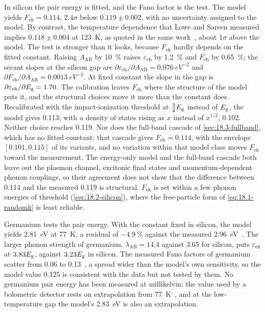 In silicon the pair energy is fitted, and the Fano factor is the test. The model yields $F_{\mathrm{eh}} = 0.114$, $2.4\sigma$ below $0.119 \pm 0.002$, with no uncertainty assigned to the model. By contrast, the temperature dependence that Lowe and Sareen measured implies $0.118 \pm 0.004$ at \SI{123}{K}, as quoted in the same work~\cite{rodrigues2021absolute}, about $1\sigma$ above the model. The test is stronger than it looks, because $F_{\mathrm{eh}}$ hardly depends on the fitted constant. Raising $A_{\mathrm{AB}}$ by \SI{10}{\percent} raises $\varepsilon_{\mathrm{eh}}$ by \SI{1.2}{\percent} and $F_{\mathrm{eh}}$ by \SI{0.65}{\percent}; the secant slopes at the silicon gap are $\partial\varepsilon_{\mathrm{eh}}/\partial A_{\mathrm{AB}} = \SI{0.076}{eV^{-2}}$ and $\partial F_{\mathrm{eh}}/\partial A_{\mathrm{AB}} = \SI{0.0013}{eV^{-3}}$. At fixed constant the slope in the gap is $\partial\varepsilon_{\mathrm{eh}}/\partial E_{\mathrm{g}} = 1.70$. The calibration leaves $F_{\mathrm{eh}}$ where the structure of the model puts it, and the structural choices move it more than the constant does. Recalibrated with the impact-ionization threshold at $\frac32E_{\mathrm{g}}$ instead of $E_{\mathrm{g}}$, the model gives 0.113; with a density of states rising as $x$ instead of $x^{1/2}$, 0.102. Neither choice reaches 0.119. Nor does the full-band cascade of \cref{sec:18.3-fullband}, which has no fitted constant: that cascade gives $F_{\mathrm{eh}} = 0.114$, with the envelope $[0.101, 0.115]$ of its variants, and no variation within that model class moves $F_{\mathrm{eh}}$ toward the measurement. The energy-only model and the full-band cascade both leave out the plasmon channel, excitonic final states and momentum-dependent phonon couplings, so their agreement does not show that the difference between 0.114 and the measured 0.119 is structural. $F_{\mathrm{eh}}$ is set within a few phonon energies of threshold (\cref{sec:18.2-silicon}), where the free-particle form of \cref{eq:18.1-randomk} is least reliable.

Germanium tests the pair energy. With the constant fixed in silicon, the model yields \SI{2.81}{eV} at \SI{77}{K}, a residual of $-\SI{4.9}{\percent}$ against the measured \SI{2.96}{eV}~\cite[Sect.~4.3]{mei2020impact}. The larger phonon strength of germanium, $\lambda_{\mathrm{AB}} = 14.4$ against 3.65 for silicon, puts $\varepsilon_{\mathrm{eh}}$ at $3.83E_{\mathrm{g}}$, against $3.23E_{\mathrm{g}}$ in silicon. The measured Fano factors of germanium scatter from 0.06 to 0.13~\cite[Sect.~4.3]{mei2020impact}, a spread wider than the model's own sensitivity, so the model value 0.125 is consistent with the data but not tested by them. No germanium pair energy has been measured at millikelvin; the value used by a bolometric detector rests on extrapolation from \SI{77}{K}~\cite{wei2016average}, and at the low-temperature gap the model's \SI{2.83}{eV} is also an extrapolation.

